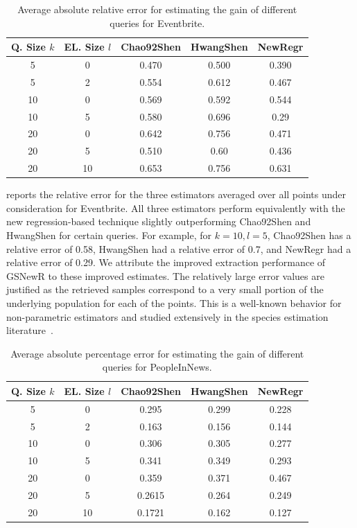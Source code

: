 \begin{table}
\scriptsize
\center
\caption{Average absolute relative error for estimating the gain of different queries for Eventbrite.}
\label{tab:eventesterror}
\begin{tabular}{|c|c|c|c|c|}
\hline
\textbf{Q. Size $k$} & \textbf{EL. Size $l$} & \textbf{Chao92Shen} & \textbf{HwangShen} & \textbf{NewRegr} \\ \hline
5 & 0 & 0.470 & 0.500 & 0.390 \\
5 & 2 & 0.554 & 0.612 & 0.467\\
10 & 0 & 0.569 & 0.592 & 0.544\\
10 & 5 & 0.580 & 0.696 & 0.29\\
20 & 0 & 0.642 & 0.756 &0.471\\
20 & 5 & 0.510 & 0.60 & 0.436 \\
20 & 10 & 0.653 & 0.756 & 0.631\\
\hline
\end{tabular}
\end{table}

 reports the relative error for the three estimators averaged over all points under consideration for Eventbrite. All three estimators perform equivalently with the new regression-based technique slightly outperforming Chao92Shen and HwangShen for certain queries. For example, for $k = 10, l = 5$, Chao92Shen has a relative error of 0.58, HwangShen had a relative error of 0.7, and NewRegr had a relative error of 0.29. We attribute the improved extraction performance of GSNewR to these improved estimates. The relatively large error values are justified as the retrieved samples correspond to a very small portion of the underlying population for each of the points. This is a well-known behavior for non-parametric estimators and studied extensively in the species estimation literature~\cite{hwang:2010}.

\begin{table}[h]
\scriptsize
\center
\caption{Average absolute percentage error for estimating the gain of different queries for PeopleInNews.}
\label{tab:peopleesterror}
\begin{tabular}{|c|c|c|c|c|}
\hline
\textbf{Q. Size $k$} & \textbf{EL. Size $l$} & \textbf{Chao92Shen} & \textbf{HwangShen} & \textbf{NewRegr} \\ \hline
5 & 0 & 0.295 & 0.299 & 0.228\\
5 & 2 & 0.163 &  0.156 & 0.144\\
10 & 0 &  0.306 & 0.305 & 0.277\\
10 & 5 &  0.341 & 0.349 & 0.293\\
20 & 0 &  0.359& 0.371 & 0.467 \\
20 & 5 &  0.2615 & 0.264 & 0.249\\
20 & 10 & 0.1721 & 0.162 & 0.127\\
\hline
\end{tabular}
\end{table}

